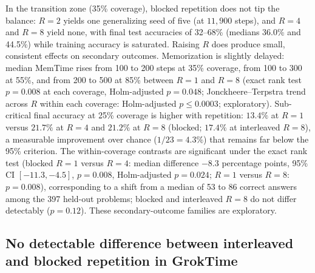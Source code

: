 \documentclass[10pt]{article}
\newcommand{\memtime}{MemTime}
\begin{document}
In the transition zone (35\% coverage), blocked repetition does not tip the balance: $R=2$ yields one generalizing seed of five (at $11{,}900$ steps), and $R=4$ and $R=8$ yield none, with final test accuracies of 32--68\% (medians 36.0\% and 44.5\%) while training accuracy is saturated. Raising $R$ does produce small, consistent effects on secondary outcomes. Memorization is slightly delayed: median \memtime{} rises from 100 to 200 steps at 35\% coverage, from 100 to 300 at 55\%, and from 200 to 500 at 85\% between $R=1$ and $R=8$ (exact rank test $p=0.008$ at each coverage, Holm-adjusted $p=0.048$; Jonckheere--Terpstra trend across $R$ within each coverage: Holm-adjusted $p \leq 0.0003$; exploratory). Sub-critical final accuracy at 25\% coverage is higher with repetition: $13.4\%$ at $R=1$ versus $21.7\%$ at $R=4$ and $21.2\%$ at $R=8$ (blocked; $17.4\%$ at interleaved $R=8$), a measurable improvement over chance ($1/23 = 4.3\%$) that remains far below the 95\% criterion. The within-coverage contrasts are significant under the exact rank test (blocked $R=1$ versus $R=4$: median difference $-8.3$ percentage points, 95\% CI $[-11.3, -4.5]$, $p=0.008$, Holm-adjusted $p=0.024$; $R=1$ versus $R=8$: $p=0.008$), corresponding to a shift from a median of 53 to 86 correct answers among the 397 held-out problems; blocked and interleaved $R=8$ do not differ detectably ($p=0.12$). These secondary-outcome families are exploratory.

\subsection{No detectable difference between interleaved and blocked repetition in GrokTime}
\label{sec:interleaved}
\end{document}
